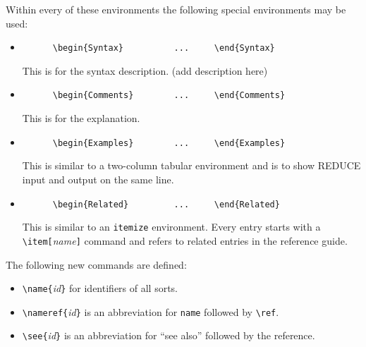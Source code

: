 Within every of these environments the following special environments
may be used:
\begin{itemize}
  \item
    \begin{verbatim}
      \begin{Syntax}          ...     \end{Syntax}
\end{verbatim}
    This is for the syntax description. (add description here)
  \item
    \begin{verbatim}
      \begin{Comments}        ...     \end{Comments}
\end{verbatim}
    This is for the explanation.
  \item 
    \begin{verbatim}
      \begin{Examples}        ...     \end{Examples}
\end{verbatim}
    This is similar to a two-column tabular environment and is to show
    REDUCE input and output on the same line.
  \item
    \begin{verbatim}
      \begin{Related}         ...     \end{Related}
\end{verbatim}
    This is similar to an \verb|itemize| environment. Every entry
    starts with a \verb|\item[|{\it name\/}\verb|]| command and refers
    to related entries in the reference guide.
\end{itemize}

The following new commands are defined:
\begin{itemize}
  \item \verb|\name{|{\it id\/}\verb|}| for identifiers of all sorts.
  \item \verb|\nameref{|{\it id\/}\verb|}| is an abbreviation for
        \verb|name| followed by \verb|\ref|.
  \item \verb|\see{|{\it id\/}\verb|}| is an abbreviation for ``see
        also'' followed by the reference.
\end{itemize}


